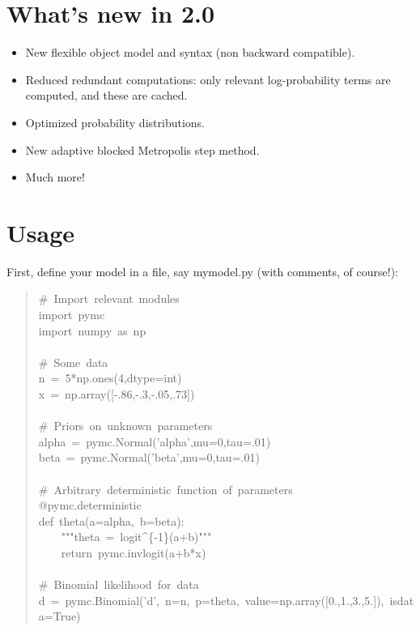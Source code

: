 
\hypertarget{what-s-new-in-2-0}{}
\section*{What's new in 2.0}
\label{what-s-new-in-2-0}
\begin{itemize}
\item {} 
New flexible object model and syntax (non backward compatible).

\item {} 
Reduced redundant computations: only relevant log-probability terms are
computed, and these are cached.

\item {} 
Optimized probability distributions.

\item {} 
New adaptive blocked Metropolis step method.

\item {} 
Much more!

\end{itemize}



\hypertarget{usage}{}
\section*{Usage}
\label{usage}

First, define your model in a file, say mymodel.py (with comments, of course!):
\begin{quote}{\ttfamily \raggedright \noindent
{\#}~Import~relevant~modules~\\
import~pymc~\\
import~numpy~as~np~\\
~\\
{\#}~Some~data~\\
n~=~5*np.ones(4,dtype=int)~\\
x~=~np.array({[}-.86,-.3,-.05,.73{]})~\\
~\\
{\#}~Priors~on~unknown~parameters~\\
alpha~=~pymc.Normal('alpha',mu=0,tau=.01)~\\
beta~=~pymc.Normal('beta',mu=0,tau=.01)~\\
~\\
{\#}~Arbitrary~deterministic~function~of~parameters~\\
@pymc.deterministic~\\
def~theta(a=alpha,~b=beta):~\\
~~~~"{}"{}"theta~=~logit{\textasciicircum}{\{}-1{\}}(a+b)"{}"{}"~\\
~~~~return~pymc.invlogit(a+b*x)~\\
~\\
{\#}~Binomial~likelihood~for~data~\\
d~=~pymc.Binomial('d',~n=n,~p=theta,~value=np.array({[}0.,1.,3.,5.{]}),~isdata=True)
}\end{quote}

